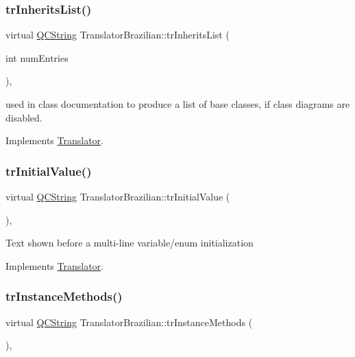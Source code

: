 \subsubsection{\texorpdfstring{trInheritsList()}{trInheritsList()}}
{\footnotesize\ttfamily virtual \mbox{\hyperlink{class_q_c_string}{Q\+C\+String}} Translator\+Brazilian\+::tr\+Inherits\+List (\begin{DoxyParamCaption}\item[{int}]{num\+Entries }\end{DoxyParamCaption})\hspace{0.3cm}{\ttfamily [inline]}, {\ttfamily [virtual]}}

used in class documentation to produce a list of base classes, if class diagrams are disabled. 

Implements \mbox{\hyperlink{class_translator}{Translator}}.

\mbox{\label{class_translator_brazilian_a52908f8b984fe425afa4485324c6e215}} 
\subsubsection{\texorpdfstring{trInitialValue()}{trInitialValue()}}
{\footnotesize\ttfamily virtual \mbox{\hyperlink{class_q_c_string}{Q\+C\+String}} Translator\+Brazilian\+::tr\+Initial\+Value (\begin{DoxyParamCaption}{ }\end{DoxyParamCaption})\hspace{0.3cm}{\ttfamily [inline]}, {\ttfamily [virtual]}}

Text shown before a multi-\/line variable/enum initialization 

Implements \mbox{\hyperlink{class_translator}{Translator}}.

\mbox{\label{class_translator_brazilian_abacecea922d60b117f2b63999287ad8a}} 
\subsubsection{\texorpdfstring{trInstanceMethods()}{trInstanceMethods()}}
{\footnotesize\ttfamily virtual \mbox{\hyperlink{class_q_c_string}{Q\+C\+String}} Translator\+Brazilian\+::tr\+Instance\+Methods (\begin{DoxyParamCaption}{ }\end{DoxyParamCaption})\hspace{0.3cm}{\ttfamily [inline]}, {\ttfamily [virtual]}}

